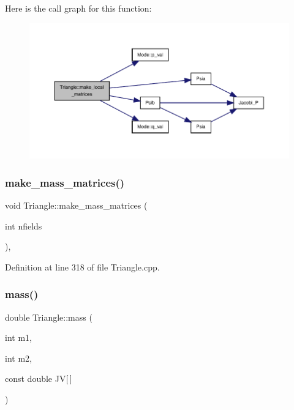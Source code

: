Here is the call graph for this function\+:
\nopagebreak
\begin{figure}[H]
\begin{center}
\leavevmode
\includegraphics[width=350pt]{classTriangle_a0266527176e45c12a896110a8e5e20f8_cgraph}
\end{center}
\end{figure}
\mbox{\label{classTriangle_ac6e4b288627df0b459fdd5f503952f6c}} 
\subsubsection{\texorpdfstring{make\+\_\+mass\+\_\+matrices()}{make\_mass\_matrices()}}
{\footnotesize\ttfamily void Triangle\+::make\+\_\+mass\+\_\+matrices (\begin{DoxyParamCaption}\item[{int}]{nfields }\end{DoxyParamCaption})\hspace{0.3cm}{\ttfamily [private]}, {\ttfamily [virtual]}}



Definition at line 318 of file Triangle.\+cpp.

\mbox{\label{classTriangle_a6728c6239f7edbf04da7246cf0ee0c8c}} 
\subsubsection{\texorpdfstring{mass()}{mass()}}
{\footnotesize\ttfamily double Triangle\+::mass (\begin{DoxyParamCaption}\item[{int}]{m1,  }\item[{int}]{m2,  }\item[{const double}]{JV\mbox{[}$\,$\mbox{]} }\end{DoxyParamCaption})\hspace{0.3cm}{\ttfamily [virtual]}}



